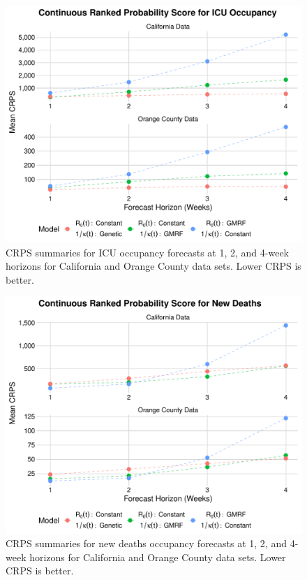 \begin{figure}
    \centering
    \includegraphics[width=1.0\columnwidth]{real_data_crps_comparison_dotplot_data_icu_plot}
    \caption[CRPS summaries for ICU occupancy forecasts for real data sets.]{CRPS summaries for ICU occupancy forecasts at 1, 2, and 4-week horizons for California and Orange County data sets. Lower CRPS is better.}
    \label{ch_5:fig:real_data_crps_comparison_dotplot_data_icu_plot}
\end{figure}

\begin{figure}
    \centering
    \includegraphics[width=1.0\columnwidth]{real_data_crps_comparison_dotplot_data_new_deaths_plot}
    \caption[CRPS summaries for new deaths occupancy forecasts for real data sets.]{CRPS summaries for new deaths occupancy forecasts at 1, 2, and 4-week horizons for California and Orange County data sets. Lower CRPS is better.}
    \label{ch_5:fig:real_data_crps_comparison_dotplot_data_new_deaths_plot}
\end{figure}

